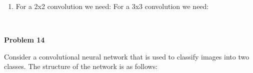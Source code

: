 \documentclass{article}
\begin{document}
\begin{enumerate} [label=\Alph*]
          Using a ReLU operation on the convolution, the output is: \\ \\
          $ conv(ReLU) = \begin{bmatrix}
              0 & 2 & 0 & 0 \\
              0 & 3 & 7 & 3 \\
              5 & 2 & 3 & 1
          \end{bmatrix}$, where every negative element of the conv matrix is turned to 0. 

          \vspace{0.8cm}
          In order to get the max-pooling output we need to add the output of the ReLU operation to the 3x4 matrix (starting from the second row of the initial input matrix I):\\ \\

          $max-pooled = \begin{bmatrix}
            0 & 2 & 0 & 0 \\
            0 & 3 & 7 & 3 \\
            5 & 2 & 3 & 1
          \end{bmatrix} + 
          \begin{bmatrix}
                5 & 6 & 18 & 20 \\
                7 & 3 & 11 & 17 \\
                2 & 1 & 8 & 16
          \end{bmatrix} \Rightarrow max-pooled = \begin{bmatrix}
              5 & 8 & 18 & 20 \\
              7 & 6 & 18 & 20 \\
              7 & 3 & 11 & 17
          \end{bmatrix}$

          \item 

          For a 2x2 convolution we need:
          For a 3x3 convolution we need:

          

          
\end{enumerate}\

\newpage
\noindent \textbf{Problem 14}

\noindent Consider a convolutional neural network that is used to classify images into two classes.
The structure of the network is as follows:
\end{document}
